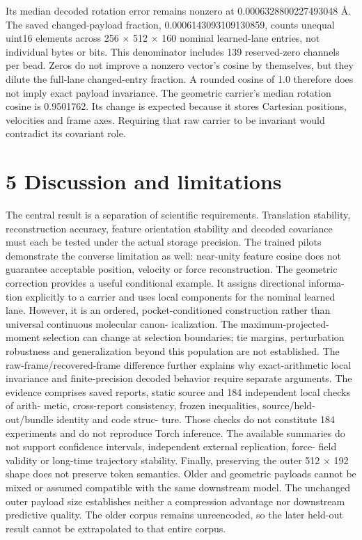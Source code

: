 \documentclass[11pt]{article}
\begin{document}
Its median decoded rotation error remains nonzero at 0.0006328800227493048 Å. The saved
changed-payload fraction, 0.0006143093109130859, counts unequal uint16 elements across 256 \ensuremath{\times}
512 \ensuremath{\times} 160 nominal learned-lane entries, not individual bytes or bits. This denominator includes 139
reserved-zero channels per bead. Zeros do not improve a nonzero vector’s cosine by themselves, but
they dilute the full-lane changed-entry fraction. A rounded cosine of 1.0 therefore does not imply
exact payload invariance.
The geometric carrier’s median rotation cosine is 0.9501762. Its change is expected because it
stores Cartesian positions, velocities and frame axes. Requiring that raw carrier to be invariant
would contradict its covariant role.

\section*{5 Discussion and limitations}

The central result is a separation of scientific requirements. Translation stability, reconstruction
accuracy, feature orientation stability and decoded covariance must each be tested under the actual
storage precision. The trained pilots demonstrate the converse limitation as well: near-unity feature
cosine does not guarantee acceptable position, velocity or force reconstruction.
The geometric correction provides a useful conditional example. It assigns directional informa-
tion explicitly to a carrier and uses local components for the nominal learned lane. However, it
is an ordered, pocket-conditioned construction rather than universal continuous molecular canon-
icalization. The maximum-projected-moment selection can change at selection boundaries; tie
margins, perturbation robustness and generalization beyond this population are not established.
The raw-frame/recovered-frame difference further explains why exact-arithmetic local invariance
and finite-precision decoded behavior require separate arguments.
The evidence comprises saved reports, static source and 184 independent local checks of arith-
metic, cross-report consistency, frozen inequalities, source/held-out/bundle identity and code struc-
ture. Those checks do not constitute 184 experiments and do not reproduce Torch inference. The
available summaries do not support confidence intervals, independent external replication, force-
field validity or long-time trajectory stability.
Finally, preserving the outer 512 \ensuremath{\times} 192 shape does not preserve token semantics. Older and
geometric payloads cannot be mixed or assumed compatible with the same downstream model.
The unchanged outer payload size establishes neither a compression advantage nor downstream
predictive quality. The older corpus remains unreencoded, so the later held-out result cannot be
extrapolated to that entire corpus.
\end{document}
